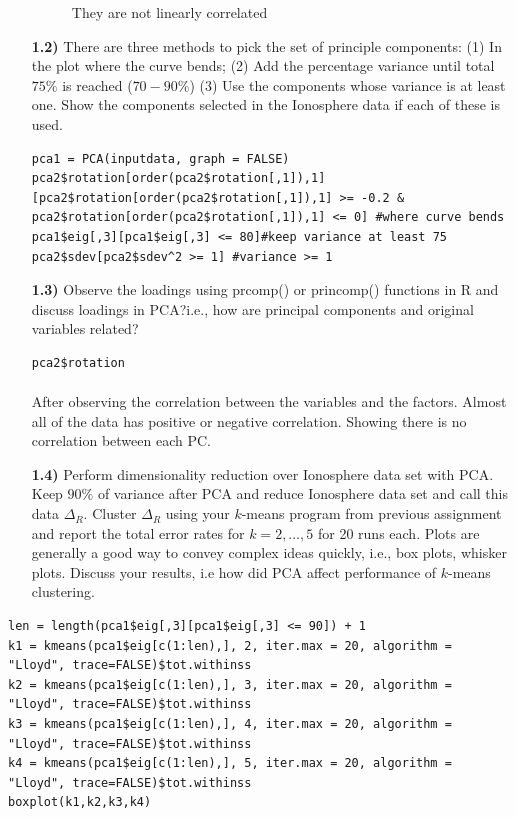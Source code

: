 \documentclass{article}
\begin{document}
\begin{enumerate}
\begin{figure}
  \caption{They are not linearly correlated}
\end{figure}
  \item[\textbf{1.2)}]  There are three methods to pick the set of principle components: (1) In the plot where the curve bends; (2)
Add the percentage variance until total $75\%$ is reached ($70-90\%$) (3) Use the components whose variance
is at least one. Show the components selected in the Ionosphere data  if each of these is used.
\\
\begin{lstlisting}
pca1 = PCA(inputdata, graph = FALSE)
pca2$rotation[order(pca2$rotation[,1]),1][pca2$rotation[order(pca2$rotation[,1]),1] >= -0.2 & pca2$rotation[order(pca2$rotation[,1]),1] <= 0] #where curve bends
pca1$eig[,3][pca1$eig[,3] <= 80]#keep variance at least 75
pca2$sdev[pca2$sdev^2 >= 1] #variance >= 1
\end{lstlisting}
  \item[\textbf{1.3)}]  Observe the loadings using prcomp() or princomp() functions in R and  discuss loadings in PCA?i.e., how are principal components and original variables related?
\\
\begin{lstlisting}
pca2$rotation
\end{lstlisting}
\paragraph{}
After observing the correlation between the variables and the factors. Almost all of the data has positive or negative correlation. Showing there is no correlation between each PC.
  \item[\textbf{1.4)}] Perform dimensionality reduction over Ionosphere data set with PCA.  Keep $90\%$ of variance  after PCA and reduce Ionosphere data set and call this data $\Delta_R$. Cluster  $\Delta_R$ using your $k$-means program from previous assignment and report the total error rates for $k = 2,\ldots,5$ for 20 runs each. Plots are generally a good way to convey complex ideas quickly, i.e., box plots, whisker plots. Discuss your results, i.e how did PCA affect  performance of $k$-means clustering.
\end{enumerate}  
\begin{lstlisting}
len = length(pca1$eig[,3][pca1$eig[,3] <= 90]) + 1
k1 = kmeans(pca1$eig[c(1:len),], 2, iter.max = 20, algorithm = "Lloyd", trace=FALSE)$tot.withinss
k2 = kmeans(pca1$eig[c(1:len),], 3, iter.max = 20, algorithm = "Lloyd", trace=FALSE)$tot.withinss
k3 = kmeans(pca1$eig[c(1:len),], 4, iter.max = 20, algorithm = "Lloyd", trace=FALSE)$tot.withinss
k4 = kmeans(pca1$eig[c(1:len),], 5, iter.max = 20, algorithm = "Lloyd", trace=FALSE)$tot.withinss
boxplot(k1,k2,k3,k4)
\end{lstlisting}
\end{document}
